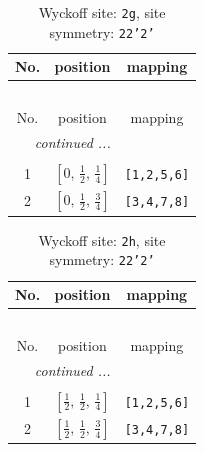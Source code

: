 \documentclass[fleqn,8pt]{jsarticle}
\begin{document}
\begin{longtable}{ccc}
\caption{Wyckoff site: {\tt 2g}, site symmetry: {\tt 22'2'}}
 \\
 \hline \hline
No. & position & mapping \\ \hline \endfirsthead

\multicolumn{2}{l}{\tablename\ \thetable{}} \\
 \hline \hline
No. & position & mapping \\ \hline \endhead

 \hline \hline
\multicolumn{2}{r}{\footnotesize\it continued ...} \\ \endfoot

 \hline \hline
\multicolumn{2}{r}{} \\ \endlastfoot

1 & $\left[ 0,\, \frac{1}{2},\, \frac{1}{4} \right]$ & {\tt [1,2,5,6]} \\ \hline
2 & $\left[ 0,\, \frac{1}{2},\, \frac{3}{4} \right]$ & {\tt [3,4,7,8]} \\
\end{longtable}
\renewcommand{\arraystretch}{1.2}
\begin{longtable}{ccc}
\caption{Wyckoff site: {\tt 2h}, site symmetry: {\tt 22'2'}}
 \\
 \hline \hline
No. & position & mapping \\ \hline \endfirsthead

\multicolumn{2}{l}{\tablename\ \thetable{}} \\
 \hline \hline
No. & position & mapping \\ \hline \endhead

 \hline \hline
\multicolumn{2}{r}{\footnotesize\it continued ...} \\ \endfoot

 \hline \hline
\multicolumn{2}{r}{} \\ \endlastfoot

1 & $\left[ \frac{1}{2},\, \frac{1}{2},\, \frac{1}{4} \right]$ & {\tt [1,2,5,6]} \\ \hline
2 & $\left[ \frac{1}{2},\, \frac{1}{2},\, \frac{3}{4} \right]$ & {\tt [3,4,7,8]} \\
\end{longtable}
\renewcommand{\arraystretch}{1.2}
\end{document}
